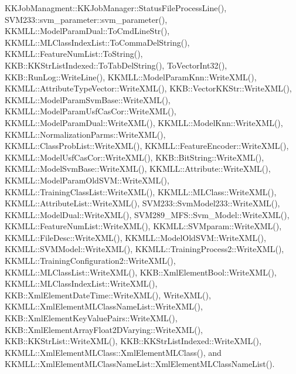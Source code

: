 K\+K\+Job\+Managment\+::\+K\+K\+Job\+Manager\+::\+Status\+File\+Process\+Line(), S\+V\+M233\+::svm\+\_\+parameter\+::svm\+\_\+parameter(), K\+K\+M\+L\+L\+::\+Model\+Param\+Dual\+::\+To\+Cmd\+Line\+Str(), K\+K\+M\+L\+L\+::\+M\+L\+Class\+Index\+List\+::\+To\+Comma\+Del\+String(), K\+K\+M\+L\+L\+::\+Feature\+Num\+List\+::\+To\+String(), K\+K\+B\+::\+K\+K\+Str\+List\+Indexed\+::\+To\+Tab\+Del\+String(), To\+Vector\+Int32(), K\+K\+B\+::\+Run\+Log\+::\+Write\+Line(), K\+K\+M\+L\+L\+::\+Model\+Param\+Knn\+::\+Write\+X\+M\+L(), K\+K\+M\+L\+L\+::\+Attribute\+Type\+Vector\+::\+Write\+X\+M\+L(), K\+K\+B\+::\+Vector\+K\+K\+Str\+::\+Write\+X\+M\+L(), K\+K\+M\+L\+L\+::\+Model\+Param\+Svm\+Base\+::\+Write\+X\+M\+L(), K\+K\+M\+L\+L\+::\+Model\+Param\+Usf\+Cas\+Cor\+::\+Write\+X\+M\+L(), K\+K\+M\+L\+L\+::\+Model\+Param\+Dual\+::\+Write\+X\+M\+L(), K\+K\+M\+L\+L\+::\+Model\+Knn\+::\+Write\+X\+M\+L(), K\+K\+M\+L\+L\+::\+Normalization\+Parms\+::\+Write\+X\+M\+L(), K\+K\+M\+L\+L\+::\+Class\+Prob\+List\+::\+Write\+X\+M\+L(), K\+K\+M\+L\+L\+::\+Feature\+Encoder\+::\+Write\+X\+M\+L(), K\+K\+M\+L\+L\+::\+Model\+Usf\+Cas\+Cor\+::\+Write\+X\+M\+L(), K\+K\+B\+::\+Bit\+String\+::\+Write\+X\+M\+L(), K\+K\+M\+L\+L\+::\+Model\+Svm\+Base\+::\+Write\+X\+M\+L(), K\+K\+M\+L\+L\+::\+Attribute\+::\+Write\+X\+M\+L(), K\+K\+M\+L\+L\+::\+Model\+Param\+Old\+S\+V\+M\+::\+Write\+X\+M\+L(), K\+K\+M\+L\+L\+::\+Training\+Class\+List\+::\+Write\+X\+M\+L(), K\+K\+M\+L\+L\+::\+M\+L\+Class\+::\+Write\+X\+M\+L(), K\+K\+M\+L\+L\+::\+Attribute\+List\+::\+Write\+X\+M\+L(), S\+V\+M233\+::\+Svm\+Model233\+::\+Write\+X\+M\+L(), K\+K\+M\+L\+L\+::\+Model\+Dual\+::\+Write\+X\+M\+L(), S\+V\+M289\+\_\+\+M\+F\+S\+::\+Svm\+\_\+\+Model\+::\+Write\+X\+M\+L(), K\+K\+M\+L\+L\+::\+Feature\+Num\+List\+::\+Write\+X\+M\+L(), K\+K\+M\+L\+L\+::\+S\+V\+Mparam\+::\+Write\+X\+M\+L(), K\+K\+M\+L\+L\+::\+File\+Desc\+::\+Write\+X\+M\+L(), K\+K\+M\+L\+L\+::\+Model\+Old\+S\+V\+M\+::\+Write\+X\+M\+L(), K\+K\+M\+L\+L\+::\+S\+V\+M\+Model\+::\+Write\+X\+M\+L(), K\+K\+M\+L\+L\+::\+Training\+Process2\+::\+Write\+X\+M\+L(), K\+K\+M\+L\+L\+::\+Training\+Configuration2\+::\+Write\+X\+M\+L(), K\+K\+M\+L\+L\+::\+M\+L\+Class\+List\+::\+Write\+X\+M\+L(), K\+K\+B\+::\+Xml\+Element\+Bool\+::\+Write\+X\+M\+L(), K\+K\+M\+L\+L\+::\+M\+L\+Class\+Index\+List\+::\+Write\+X\+M\+L(), K\+K\+B\+::\+Xml\+Element\+Date\+Time\+::\+Write\+X\+M\+L(), Write\+X\+M\+L(), K\+K\+M\+L\+L\+::\+Xml\+Element\+M\+L\+Class\+Name\+List\+::\+Write\+X\+M\+L(), K\+K\+B\+::\+Xml\+Element\+Key\+Value\+Pairs\+::\+Write\+X\+M\+L(), K\+K\+B\+::\+Xml\+Element\+Array\+Float2\+D\+Varying\+::\+Write\+X\+M\+L(), K\+K\+B\+::\+K\+K\+Str\+List\+::\+Write\+X\+M\+L(), K\+K\+B\+::\+K\+K\+Str\+List\+Indexed\+::\+Write\+X\+M\+L(), K\+K\+M\+L\+L\+::\+Xml\+Element\+M\+L\+Class\+::\+Xml\+Element\+M\+L\+Class(), and K\+K\+M\+L\+L\+::\+Xml\+Element\+M\+L\+Class\+Name\+List\+::\+Xml\+Element\+M\+L\+Class\+Name\+List().


